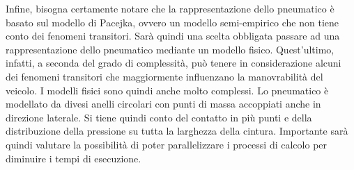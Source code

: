 Infine, bisogna certamente notare che la rappresentazione dello pneumatico è basato sul modello di Pacejka, ovvero un modello semi-empirico che non tiene conto dei fenomeni transitori. Sarà quindi una scelta obbligata passare ad una rappresentazione dello pneumatico mediante un modello fisico. Quest'ultimo, infatti, a seconda del grado di complessità, può tenere in considerazione alcuni dei fenomeni transitori che maggiormente influenzano la manovrabilità del veicolo. I modelli fisici sono quindi anche molto complessi. Lo pneumatico è modellato da divesi anelli circolari con punti di massa accoppiati anche in direzione laterale. Si tiene quindi conto del contatto in più punti e della distribuzione della pressione su tutta la larghezza della cintura. Importante sarà quindi valutare la possibilità di poter parallelizzare i processi di calcolo per diminuire i tempi di esecuzione.